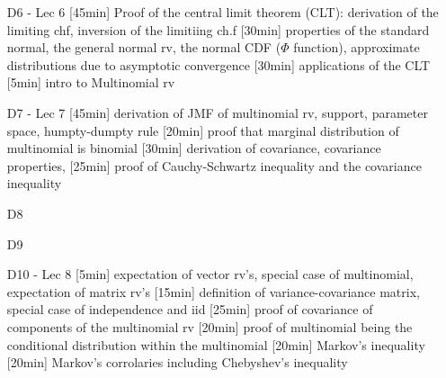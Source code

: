 \begin{enumerate}



\item[D6 - Lec 6] [45min] Proof of the central limit theorem (CLT): derivation of the limiting chf, inversion of the limitiing ch.f [30min] properties of the standard normal, the general normal rv, the normal CDF ($\Phi$ function), approximate distributions due to asymptotic convergence [30min] applications of the CLT [5min] intro to Multinomial rv

\item[D7 - Lec 7] [45min] derivation of JMF of multinomial rv, support, parameter space, humpty-dumpty rule [20min] proof that marginal distribution of multinomial is binomial [30min] derivation of covariance, covariance properties, [25min] proof of Cauchy-Schwartz inequality and the covariance inequality



\item[D8] 
\item[D9] 


\item[D10 - Lec 8]  [5min] expectation of vector rv's, special case of multinomial, expectation of matrix rv's [15min] definition of variance-covariance matrix, special case of independence and iid [25min] proof of covariance of components of the multinomial rv [20min] proof of multinomial being the conditional distribution within the multinomial [20min] Markov's inequality [20min] Markov's corrolaries including Chebyshev's inequality


\end{enumerate}
